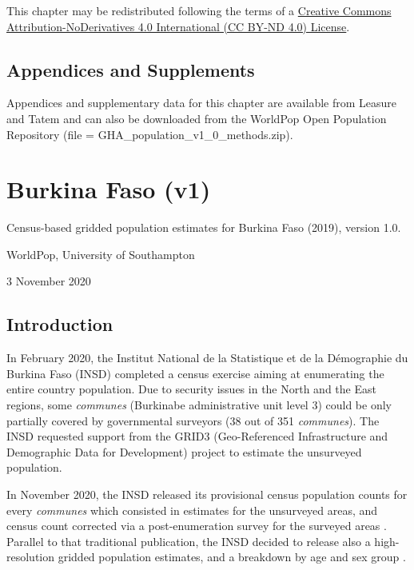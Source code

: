 \documentclass[]{book}
\begin{document}
This chapter may be redistributed following the terms of a
\href{https://creativecommons.org/licenses/by-nd/4.0/}{Creative Commons
Attribution-NoDerivatives 4.0 International (CC BY-ND 4.0) License}.

\section*{Appendices and Supplements}\label{appendices-and-supplements}

Appendices and supplementary data for this chapter are available from
Leasure and Tatem \citeyearpar{leasure2020approach} and can also be
downloaded from the WorldPop Open Population Repository (file =
GHA\_population\_v1\_0\_methods.zip).

\chapter{Burkina Faso (v1)}\label{burkina-faso-v1}

Census-based gridded population estimates for Burkina Faso (2019),
version 1.0.

WorldPop, University of Southampton

3 November 2020

\section{Introduction}\label{introduction-2}

In February 2020, the Institut National de la Statistique et de la
Démographie du Burkina Faso (INSD) completed a census exercise aiming at
enumerating the entire country population. Due to security issues in the
North and the East regions, some \emph{communes} (Burkinabe
administrative unit level 3) could be only partially covered by
governmental surveyors (38 out of 351 \emph{communes}). The INSD
requested support from the GRID3 (Geo-Referenced Infrastructure and
Demographic Data for Development) project to estimate the unsurveyed
population.

In November 2020, the INSD released its provisional census population
counts for every \emph{communes} which consisted in estimates for the
unsurveyed areas, and census count corrected via a post-enumeration
survey for the surveyed areas \citep{insd2019recensement}. Parallel to
that traditional publication, the INSD decided to release also a
high-resolution gridded population estimates, and a breakdown by age and
sex group \citep{worldpop2020}.
\end{document}
